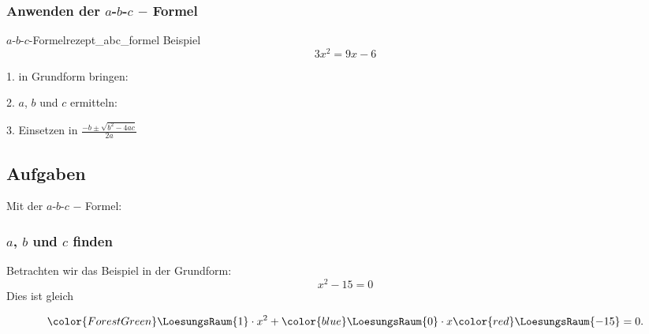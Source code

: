 \newpage


\subsubsection{Anwenden der $a$-$b$-$c$ $-$ Formel}
\begin{rezept}{$a$-$b$-$c$-Formel}{rezept_abc_formel}
  Beispiel $$3x^2 = 9x - 6$$

  1. in Grundform bringen: 


2. $a$, $b$ und $c$ ermitteln:


3. Einsetzen in \large{ $\frac{-b \pm \sqrt{b^2-4ac}}{2a}$}

\end{rezept}

\subsection*{Aufgaben}
Mit der $a$-$b$-$c$ $-$ Formel:
\newpage



\subsubsection{$a$, $b$ und $c$ finden}


Betrachten wir das Beispiel in der Grundform:
$$x^2 - 15 = 0$$
Dies ist gleich

$$ {\color{ForestGreen}\LoesungsRaum{1}  \cdot{} }  x^2 +
{\color{blue} \LoesungsRaum{0}\cdot{}} x {
  \color{red} \LoesungsRaum{- 15}} = 0.$$

